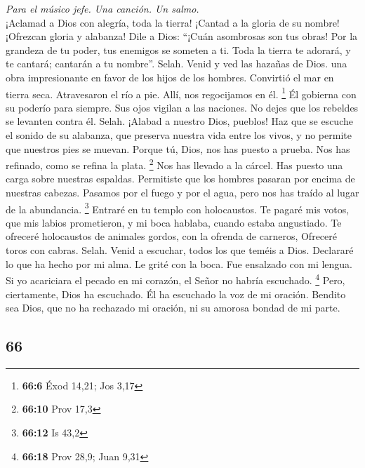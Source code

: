 \begin{paracol}{2}
\emph{Para el músico jefe. Una canción. Un salmo.}\\
 ¡Aclamad a Dios con alegría, toda la tierra!
 ¡Cantad a la gloria de su nombre! ¡Ofrezcan gloria y
alabanza!  Dile a Dios: ``¡Cuán asombrosas son tus obras!
Por la grandeza de tu poder, tus enemigos se someten a ti.
 Toda la tierra te adorará, y te cantará; cantarán a tu
nombre''. Selah.  Venid y ved las hazañas de Dios. una
obra impresionante en favor de los hijos de los hombres. 
Convirtió el mar en tierra seca. Atravesaron el río a pie. Allí, nos
regocijamos en él. \footnote{\textbf{66:6} Éxod 14,21; Jos 3,17}
 Él gobierna con su poderío para siempre. Sus ojos vigilan
a las naciones. No dejes que los rebeldes se levanten contra él. Selah.
 ¡Alabad a nuestro Dios, pueblos! Haz que se escuche el
sonido de su alabanza,  que preserva nuestra vida entre
los vivos, y no permite que nuestros pies se muevan. 
Porque tú, Dios, nos has puesto a prueba. Nos has refinado, como se
refina la plata. \footnote{\textbf{66:10} Prov 17,3}  Nos
has llevado a la cárcel. Has puesto una carga sobre nuestras espaldas.
 Permitiste que los hombres pasaran por encima de
nuestras cabezas. Pasamos por el fuego y por el agua, pero nos has
traído al lugar de la abundancia. \footnote{\textbf{66:12} Is 43,2}
 Entraré en tu templo con holocaustos. Te pagaré mis
votos,  que mis labios prometieron, y mi boca hablaba,
cuando estaba angustiado.  Te ofreceré holocaustos de
animales gordos, con la ofrenda de carneros, Ofreceré toros con cabras.
Selah.  Venid a escuchar, todos los que teméis a Dios.
Declararé lo que ha hecho por mi alma.  Le grité con la
boca. Fue ensalzado con mi lengua.  Si yo acariciara el
pecado en mi corazón, el Señor no habría escuchado. \footnote{\textbf{66:18}
  Prov 28,9; Juan 9,31}  Pero, ciertamente, Dios ha
escuchado. Él ha escuchado la voz de mi oración.  Bendito
sea Dios, que no ha rechazado mi oración, ni su amorosa bondad de mi
parte.

\switchcolumn
\begin{otherlanguage}{english}

\hypertarget{section-131}{%
\section{66}\label{section-131}}


\end{otherlanguage}
\end{paracol}
